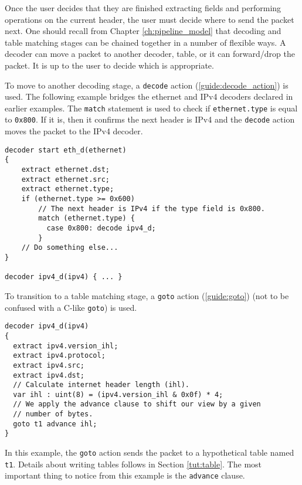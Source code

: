 Once the user decides that they are finished extracting fields and performing operations on the current header, the user must decide where to send the packet next. One should recall from Chapter \ref{ch:pipeline_model} that decoding and
table matching stages can be chained together in a number of flexible ways.
A decoder can move a packet to another decoder, table, or it can forward/drop
the packet. It is up to the user to decide which is appropriate.

To move to another decoding stage, a \texttt{decode} action (\ref{guide:decode_action})
is used. The following example bridges the ethernet and IPv4 decoders
declared in earlier examples. The \texttt{match} statement is used to check if \texttt{ethernet.type} is equal to
\texttt{0x800}. If it is, then it confirms the next header is IPv4 and the \texttt{decode} action moves the packet to the IPv4 decoder.

\begin{codepage}
\begin{lstlisting}
decoder start eth_d(ethernet)
{
	extract ethernet.dst;
	extract ethernet.src;
	extract ethernet.type;
	if (ethernet.type >= 0x600)
	  	// The next header is IPv4 if the type field is 0x800.
	    match (ethernet.type) {
	      case 0x800: decode ipv4_d;
	    }
	// Do something else...
}

decoder ipv4_d(ipv4) { ... }
\end{lstlisting}
\end{codepage}

To transition to a table matching stage, a \texttt{goto} action (\ref{guide:goto}) (not
to be confused with a C-like \texttt{goto}) is used.

\begin{codepage}
\begin{lstlisting}
decoder ipv4_d(ipv4)
{
  extract ipv4.version_ihl;
  extract ipv4.protocol;
  extract ipv4.src;
  extract ipv4.dst;
  // Calculate internet header length (ihl).
  var ihl : uint(8) = (ipv4.version_ihl & 0x0f) * 4;
  // We apply the advance clause to shift our view by a given
  // number of bytes.
  goto t1 advance ihl;
}
\end{lstlisting}
\end{codepage}

In this example, the \texttt{goto} action sends the packet to a hypothetical table
named \texttt{t1}. Details about writing tables follows in Section \ref{tut:table}. The most important thing to notice from this example is the
\texttt{advance} clause.

